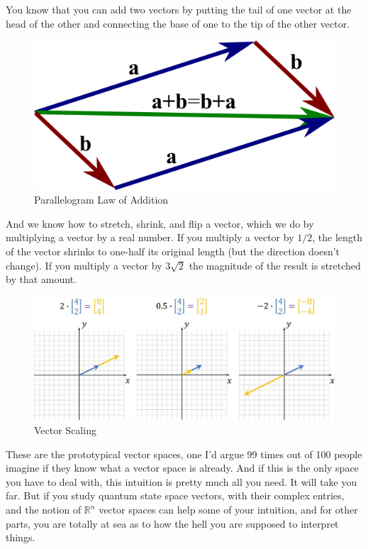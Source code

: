 \documentclass[
]{book}
\begin{document}
You know that you can add two vectors by putting the tail of one vector at the head of the other and connecting the base of one to the tip of the other vector.

\begin{figure}

{\centering \includegraphics[width=0.75\linewidth,height=0.75\textheight]{images/vector_parallelogram_law} 

}

\caption{Parallelogram Law of Addition}\label{fig:unnamed-chunk-1}
\end{figure}

And we know how to stretch, shrink, and flip a vector, which we do by multiplying a vector by a real number. If you multiply a vector by \(1/2\), the length of the vector shrinks to one-half its original length (but the direction doesn't change). If you multiply a vector by \(3 \sqrt{2}\) the magnitude of the result is stretched by that amount.

\begin{figure}

{\centering \includegraphics[width=1\linewidth,height=1\textheight]{images/Vector-scaling} 

}

\caption{Vector Scaling}\label{fig:unnamed-chunk-2}
\end{figure}

These are the prototypical vector spaces, one I'd argue 99 times out of 100 people imagine if they know what a vector space is already. And if this is the only space you have to deal with, this intuition is pretty much all you need. It will take you far. But if you study quantum state space vectors, with their complex entries, and the notion of \(\mathbb{R}^n\) vector spaces can help some of your intuition, and for other parts, you are totally at sea as to how the hell you are supposed to interpret things.
\end{document}
